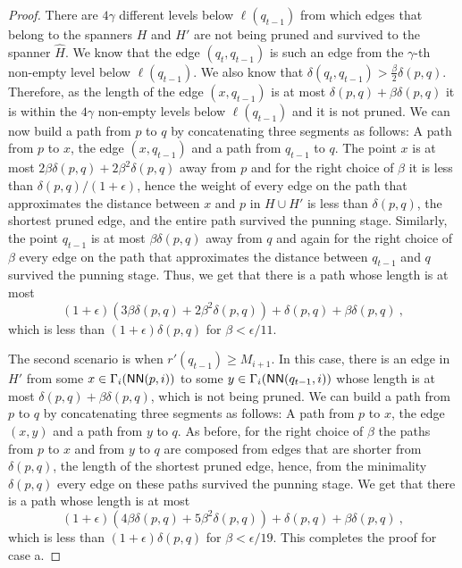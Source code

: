 \documentclass[proceedings]{stacs}
\theoremstyle{plain}\newtheorem{satz}[thm]{Satz}
\theoremstyle{definition}\newtheorem{crucial}[thm]{Crucial Definition}
\newcommand{\eps}{\epsilon}
\newcommand{\NN}{\mbox{\sf NN}}
\begin{document}
\begin{proof}
There are $4\gamma$ different levels below $\ell(q_{t-1})$ from
which edges that belong to the spanners $H$ and $H'$ are not being
pruned and survived to the spanner $\hat{H}$. We know that the
edge $(q_t,q_{t-1})$ is such an edge from the $\gamma$-th
non-empty level below $\ell(q_{t-1})$. We also know that
$\delta(q_t,q_{t-1})>\frac{\beta}{2} \delta(p,q)$. Therefore, as
the length of the edge $(x,q_{t-1})$ is at most
$\delta(p,q)+\beta\delta(p,q)$ it is within the $4\gamma$
non-empty levels below $\ell(q_{t-1})$ and it is not pruned. We
can now build a path from $p$ to $q$ by concatenating three
segments as follows: A path from $p$ to $x$, the edge
$(x,q_{t-1})$ and a path from $q_{t-1}$ to $q$. The point $x$ is
at most $2\beta\delta(p,q)+2\beta^2\delta(p,q)$ away from $p$ and
for the right choice of $\beta$ it is less than
$\delta(p,q)/(1+\eps)$, hence the weight of every edge on the path
that approximates the distance between $x$ and $p$ in $H\cup H'$
is less than $\delta(p,q)$, the shortest pruned edge, and the
entire path survived the punning stage. Similarly, the point
$q_{t-1}$ is at most $\beta\delta(p,q)$ away from $q$ and again
for the right choice of $\beta$ every edge on the path that
approximates the distance between $q_{t-1}$ and $q$ survived the
punning stage. Thus, we get that there is a path whose length is
at most
$$(1+\eps)(3\beta\delta(p,q)+2\beta^2\delta(p,q))+\delta(p,q)+\beta\delta(p,q)~,$$
which is less than $(1+\eps)\delta(p,q)$ for $\beta<\eps/11$.

The second scenario is when $r'(q_{t-1}) \geq M_{i+1}$. In this
case, there is an edge in $H'$ from some $x \in
\Gamma_{i}(\NN(p,i))$ to some $y\in \Gamma_{i}(\NN(q_{t-1},i))$
whose length is at most $\delta(p,q)+\beta\delta(p,q)$, which is
not being pruned. We can build a path from $p$ to $q$ by
concatenating three segments as follows: A path from $p$ to $x$,
the edge $(x,y)$ and a path from $y$ to $q$. As before, for the
right choice of $\beta$ the paths from $p$ to $x$ and from $y$ to
$q$ are composed from edges that are shorter from $\delta(p,q)$,
the length of the shortest pruned edge, hence, from the minimality
$\delta(p,q)$ every edge on these paths survived the punning
stage. We get that there is a path whose length is at most
$$(1+\eps)(4\beta\delta(p,q)+5\beta^2\delta(p,q))+\delta(p,q)+
\beta\delta(p,q)~,$$
which is less than $(1+\eps)\delta(p,q)$ for $\beta<\eps/19$. This
completes the proof for case a.


\end{proof}
\end{document}
